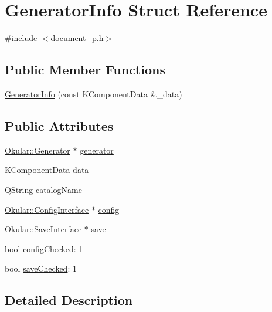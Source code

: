 \hypertarget{structGeneratorInfo}{\section{Generator\+Info Struct Reference}
\label{structGeneratorInfo}
}


{\ttfamily \#include $<$document\+\_\+p.\+h$>$}

\subsection*{Public Member Functions}
\begin{DoxyCompactItemize}
\item 
\hyperlink{structGeneratorInfo_a0bfbaae065160e021f99e78b5d111d83}{Generator\+Info} (const K\+Component\+Data \&\+\_\+data)
\end{DoxyCompactItemize}
\subsection*{Public Attributes}
\begin{DoxyCompactItemize}
\item 
\hyperlink{classOkular_1_1Generator}{Okular\+::\+Generator} $\ast$ \hyperlink{structGeneratorInfo_ac8796e620ca4a6f3fb08f610c14a6ec2}{generator}
\item 
K\+Component\+Data \hyperlink{structGeneratorInfo_ab0cd82143649f4aad772614dc77e2ef8}{data}
\item 
Q\+String \hyperlink{structGeneratorInfo_a356093909f493a87158b07b9f25ddfcb}{catalog\+Name}
\item 
\hyperlink{classOkular_1_1ConfigInterface}{Okular\+::\+Config\+Interface} $\ast$ \hyperlink{structGeneratorInfo_adb5d606668bd3268c19f23e9c3183f98}{config}
\item 
\hyperlink{classOkular_1_1SaveInterface}{Okular\+::\+Save\+Interface} $\ast$ \hyperlink{structGeneratorInfo_a9c449e96a994af33db9fb1ef723b15e2}{save}
\item 
bool \hyperlink{structGeneratorInfo_a9143bfaf86f93f46fe719f7ec6c37ab5}{config\+Checked}\+: 1
\item 
bool \hyperlink{structGeneratorInfo_a01a979aa72570fde20d2efd8a442a7bc}{save\+Checked}\+: 1
\end{DoxyCompactItemize}


\subsection{Detailed Description}



